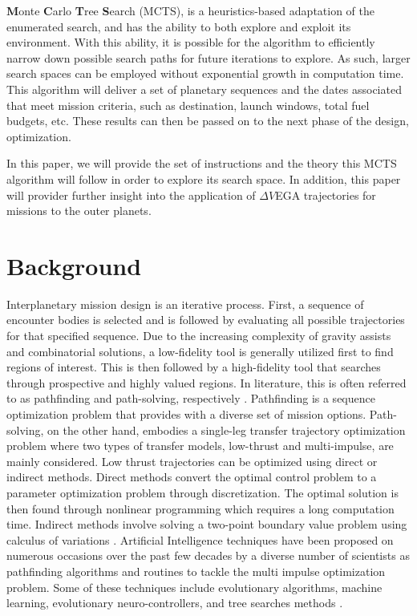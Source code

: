 \documentclass[letterpaper, preprint, paper,11pt]{AAS}	%
\begin{document}
\textbf{M}onte \textbf{C}arlo \textbf{T}ree \textbf{S}earch (MCTS), is a heuristics-based adaptation of the enumerated search, and has the ability to both explore and exploit its environment. With this ability, it is possible for the algorithm to efficiently narrow down possible search paths for future iterations to explore. As such, larger search spaces can be employed without exponential growth in computation time. This algorithm will deliver a set of planetary sequences and the dates associated that meet mission criteria, such as destination, launch windows, total fuel budgets, etc. These results can then be passed on to the next phase of the design, optimization.

In this paper, we will provide the set of instructions and the theory this MCTS algorithm will follow in order to explore its search space. In addition, this paper will provider further insight into the application of $\Delta V$EGA trajectories for missions to the outer planets.

\section{Background}

Interplanetary mission design is an iterative process. First, a sequence of encounter bodies is selected and is followed by evaluating all possible trajectories for that specified sequence. Due to the increasing complexity of gravity assists and combinatorial solutions, a low-fidelity tool is generally utilized first to find regions of interest. This is then followed by a high-fidelity tool that searches through prospective and highly valued regions.  In literature, this is often referred to as pathfinding and path-solving, respectively \cite{Hughes2016}. Pathfinding is a sequence optimization problem that provides with a diverse set of mission options. Path-solving, on the other hand, embodies a single-leg transfer trajectory optimization problem where two types of transfer models, low-thrust and multi-impulse, are mainly considered\cite{Li2019}. Low thrust trajectories can be optimized using direct or indirect methods. Direct methods convert the optimal control problem to a parameter optimization problem through discretization. The optimal solution is then found through nonlinear programming which requires a long computation time. Indirect methods involve solving a two-point boundary value problem using calculus of variations \cite{Jiang2012}. Artificial Intelligence techniques have been proposed on numerous occasions over the past few decades by a diverse number of scientists as pathfinding algorithms and routines to tackle the multi impulse optimization problem. Some of these techniques include evolutionary algorithms, machine learning, evolutionary neuro-controllers, and tree searches methods \cite{Izzo2019}.
\end{document}
